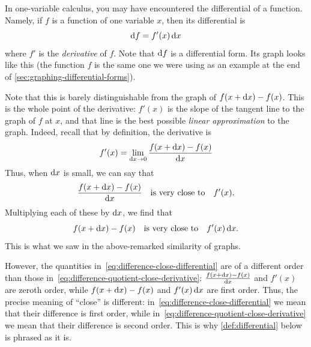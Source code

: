 \documentclass[12pt]{amsart}
\begin{document}
In one-variable calculus, you may have encountered the differential of a function.
Namely, if $f$ is a function of one variable $x$, then its differential is
\begin{equation}
  {\ensuremath{\mathrm{d} f}} = f'(x) \, {\mathrm{d} x}\label{eq:onevariable-differential}
\end{equation}
where $f'$ is the \emph{derivative} of $f$.
Note that ${\mathrm{d} f}$ is a differential form.
Its graph looks like this (the function $f$ is the same one we were using as an example at the end of \cref{sec:graphing-differential-forms}).
\begin{center}
\end{center}
Note that this is barely distinguishable from the graph of $f(x+{\mathrm{d} x})-f(x)$.
This is the whole point of the derivative: $f'(x)$ is the slope of the tangent line to the graph of $f$ at $x$, and that line is the best possible \emph{linear approximation} to the graph.
Indeed, recall that by definition, the derivative is
\[ f'(x) = \lim_{{\mathrm{d} x}\to 0} \frac{f(x+{\mathrm{d} x})-f(x)}{{\mathrm{d} x}} \]
Thus, when ${\mathrm{d} x}$ is small, we can say that
\begin{equation}\label{eq:difference-quotient-close-derivative}
  \frac{f(x+{\mathrm{d} x})-f(x)}{{\mathrm{d} x}}\quad\text{is very close to}\quad f'(x).
\end{equation}
Multiplying each of these by ${\mathrm{d} x}$, we find that
\begin{equation}
  f(x+{\mathrm{d} x})-f(x) \quad\text{is very close to}\quad f'(x)\,{\mathrm{d} x}.\label{eq:difference-close-differential}
\end{equation}
This is what we saw in the above-remarked similarity of graphs.

\begin{adv}
  However, the quantities in~\cref{eq:difference-close-differential} are of a different order than those in~\cref{eq:difference-quotient-close-derivative}:
  $\frac{f(x+{\mathrm{d} x})-f(x)}{{\mathrm{d} x}}$ and $f'(x)$ are zeroth order, while $f(x+{\mathrm{d} x})-f(x)$ and $f'(x)\,{\mathrm{d} x}$ are first order.
  Thus, the precise meaning of ``close'' is different: in~\cref{eq:difference-close-differential} we mean that their difference is first order, while in~\cref{eq:difference-quotient-close-derivative} we mean that their difference is second order.
  This is why \cref{def:differential} below is phrased as it is.
\end{adv}
\end{document}
